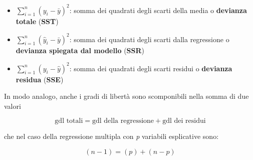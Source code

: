 \begin{itemize}
	\item $\sum_{i=1}^n (y_i - \bar{y})^2$: somma dei quadrati degli scarti della media o \textbf{devianza totale} (\textbf{SST})
	\item $\sum_{i=1}^n (\hat{y}_i - \bar{y})^2$: somma dei quadrati degli scarti dalla regressione o \textbf{devianza spiegata dal modello} (\textbf{SSR})
	\item $ \sum_{i=1}^n (y_i - \hat{y})^2 $: somma dei quadrati degli scarti residui o \textbf{devianza residua} (\textbf{SSE})
\end{itemize}

In modo analogo, anche i gradi di libertà sono scomponibili nella somma di due valori

$$
\text{gdl totali} = \text{gdl della regressione} + \text{gdl dei residui}
$$

che nel caso della regressione multipla con \textit{p} variabili esplicative sono:

$$
(n -1) = (p) + (n-p)
$$




















